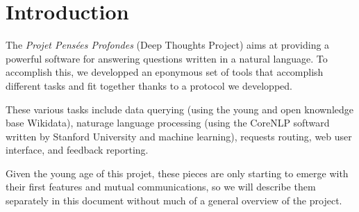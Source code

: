 \section{Introduction}

The {\em Projet Pensées Profondes} (Deep Thoughts Project) aims at
providing a powerful software for answering questions written in a
natural language.
To accomplish this, we developped an eponymous set of tools that
accomplish different tasks and fit together thanks to a protocol
we developped.

These various tasks include data querying (using the young and open
knownledge base Wikidata), naturage language processing (using the
CoreNLP softward written by Stanford University and machine learning),
requests routing, web user interface, and feedback reporting.

Given the young age of this projet, these pieces are only starting
to emerge with their first features and mutual communications,
so we will describe them separately in this document without
much of a general overview of the project.
